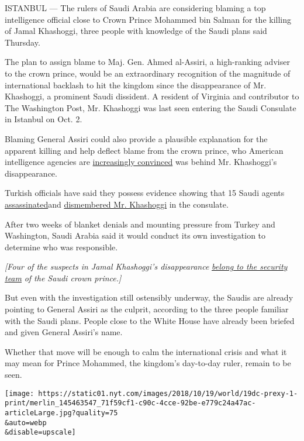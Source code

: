 ISTANBUL --- The rulers of Saudi Arabia are considering blaming a top
intelligence official close to Crown Prince Mohammed bin Salman for the
killing of Jamal Khashoggi, three people with knowledge of the Saudi
plans said Thursday.

The plan to assign blame to Maj. Gen. Ahmed al-Assiri, a high-ranking
adviser to the crown prince, would be an extraordinary recognition of
the magnitude of international backlash to hit the kingdom since the
disappearance of Mr. Khashoggi, a prominent Saudi dissident. A resident
of Virginia and contributor to The Washington Post, Mr. Khashoggi was
last seen entering the Saudi Consulate in Istanbul on Oct. 2.

Blaming General Assiri could also provide a plausible explanation for
the apparent killing and help deflect blame from the crown prince, who
American intelligence agencies are
\href{https://www.nytimes.com/2018/10/17/world/middleeast/pompeo-khashoggi-murder.html}{increasingly
convinced} was behind Mr. Khashoggi's disappearance.

Turkish officials have said they possess evidence showing that 15 Saudi
agents
\href{https://www.nytimes.com/2018/10/17/world/europe/turkey-saudi-khashoggi-dismember.html}{assassinated}and
\href{https://www.nytimes.com/2018/10/17/world/europe/turkey-saudi-khashoggi-dismember.html}{dismembered
Mr. Khashoggi} in the consulate.

After two weeks of blanket denials and mounting pressure from Turkey and
Washington, Saudi Arabia said it would conduct its own investigation to
determine who was responsible.

\emph{{[}Four of the suspects in Jamal Khashoggi's disappearance}
\href{https://www.nytimes.com/2018/10/16/world/middleeast/khashoggi-saudi-prince.html?action=click\&module=Intentional\&pgtype=Article}{\emph{belong
to the security team}} \emph{of the Saudi crown prince.{]}}

But even with the investigation still ostensibly underway, the Saudis
are already pointing to General Assiri as the culprit, according to the
three people familiar with the Saudi plans. People close to the White
House have already been briefed and given General Assiri's name.

Whether that move will be enough to calm the international crisis and
what it may mean for Prince Mohammed, the kingdom's day-to-day ruler,
remain to be seen.

\texttt{[image: https://static01.nyt.com/images/2018/10/19/world/19dc-prexy-1-print/merlin\_145463547\_71f59cf1-c90c-4cce-92be-e779c24a47ac-articleLarge.jpg?quality=75\\\&auto=webp\\\&disable=upscale]}

